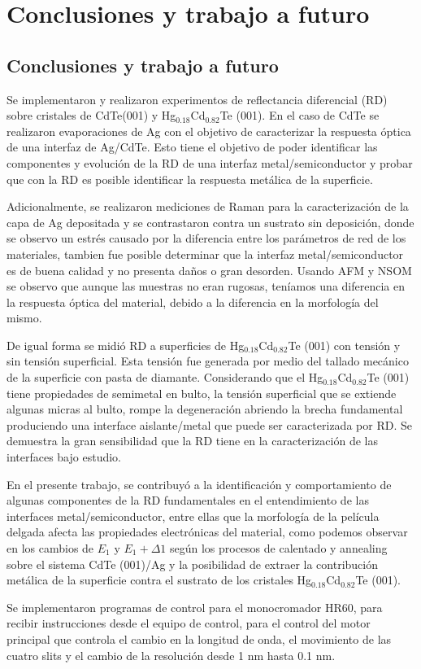 \chapter{Conclusiones y trabajo a futuro}
\label{chap:conclusions}
\textit{}
\vfill
\minitoc
\newpage
\section{Conclusiones y trabajo a futuro}
\label{ch5:conlusions}
Se implementaron y realizaron experimentos de reflectancia diferencial (RD) sobre cristales de CdTe(001) y Hg$_{0.18}$Cd$_{0.82}$Te (001). En el caso de CdTe se realizaron evaporaciones de Ag con el objetivo de caracterizar la respuesta óptica de una interfaz de Ag/CdTe. Esto tiene el objetivo de poder identificar las componentes y evolución de la RD de una interfaz metal/semiconductor y probar que con la RD es posible identificar la respuesta metálica de la superficie.

Adicionalmente, se realizaron mediciones de Raman para la caracterización de la capa de Ag depositada y se contrastaron contra un sustrato sin deposición, donde se observo un estrés causado por la diferencia entre los parámetros de red de los materiales, tambien fue posible determinar que la interfaz metal/semiconductor es de buena calidad y no presenta 
daños o gran desorden. Usando AFM y NSOM se observo que aunque las muestras no eran rugosas, teníamos una diferencia en la respuesta óptica del material, debido a la diferencia en la morfología del mismo.

De igual forma se midió RD a superficies de Hg$_{0.18}$Cd$_{0.82}$Te (001) con tensión y sin tensión superficial. Esta tensión fue generada por medio del tallado mecánico de la superficie con pasta de diamante. Considerando que el Hg$_{0.18}$Cd$_{0.82}$Te (001) 
tiene propiedades de semimetal en bulto, la tensión superficial que se extiende algunas micras al bulto, rompe la degeneración abriendo la brecha fundamental produciendo una interface aislante/metal que puede ser caracterizada por RD. 
Se demuestra la gran sensibilidad que la RD tiene en la caracterización de las interfaces bajo estudio.

En el presente trabajo, se contribuyó a la identificación y comportamiento de algunas componentes de la RD fundamentales en el entendimiento de las interfaces metal/semiconductor, entre ellas que la morfología de la película delgada afecta las propiedades electrónicas del material, como podemos observar en los cambios de $E_{1}$ y $E_{1}+\Delta1$ según los procesos de calentado y annealing sobre el sistema CdTe (001)/Ag y la posibilidad de extraer la contribución metálica de la superficie contra el sustrato de los cristales Hg$_{0.18}$Cd$_{0.82}$Te (001).

Se implementaron programas de control para el monocromador HR60, para recibir instrucciones desde el equipo de control, para el control del motor principal que controla el cambio en la longitud de onda, el movimiento de las cuatro slits y el cambio de la resolución desde 1 nm hasta 0.1 nm.

